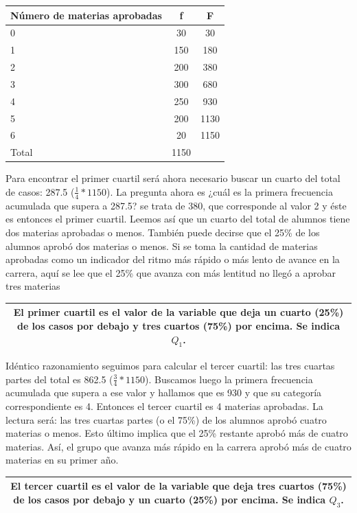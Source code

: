\documentclass[]{book}
\begin{document}
\begin{longtable}[]{@{}lcc@{}}
\toprule
Número de materias aprobadas & f & F\tabularnewline
\midrule
\endhead
0 & 30 & 30\tabularnewline
1 & 150 & 180\tabularnewline
2 & 200 & 380\tabularnewline
3 & 300 & 680\tabularnewline
4 & 250 & 930\tabularnewline
5 & 200 & 1130\tabularnewline
6 & 20 & 1150\tabularnewline
Total & 1150 &\tabularnewline
\bottomrule
\end{longtable}

Para encontrar el primer cuartil será ahora necesario buscar un cuarto
del total de casos: 287.5 (\(\frac{1}{4}*1150\)). La pregunta ahora es ¿cuál es
la primera frecuencia acumulada que supera a 287.5? se trata de 380, que
corresponde al valor 2 y éste es entonces el primer cuartil. Leemos así
que un cuarto del total de alumnos tiene dos materias aprobadas o menos.
También puede decirse que el 25\% de los alumnos aprobó dos materias o
menos. Si se toma la cantidad de materias aprobadas como un indicador
del ritmo más rápido o más lento de avance en la carrera, aquí se lee
que el 25\% que avanza con más lentitud no llegó a aprobar tres materias

\begin{longtable}[]{@{}c@{}}
\toprule
\endhead
\begin{minipage}[t]{0.97\columnwidth}\centering
El \textbf{primer cuartil} es el valor de la variable que deja un cuarto (25\%) de los casos por debajo y tres cuartos (75\%) por encima. Se indica \(Q_1\).\strut
\end{minipage}\tabularnewline
\bottomrule
\end{longtable}

Idéntico razonamiento seguimos para calcular el tercer cuartil: las tres
cuartas partes del total es 862.5 (\(\frac{3}{4}*1150\)). Buscamos luego la
primera frecuencia acumulada que supera a ese valor y hallamos que es
930 y que su categoría correspondiente es 4. Entonces el tercer cuartil
es 4 materias aprobadas. La lectura será: las tres cuartas partes (o el
75\%) de los alumnos aprobó cuatro materias o menos. Esto último implica
que el 25\% restante aprobó más de cuatro materias. Así, el grupo que
avanza más rápido en la carrera aprobó más de cuatro materias en su
primer año.

\begin{longtable}[]{@{}c@{}}
\toprule
\endhead
\begin{minipage}[t]{0.97\columnwidth}\centering
El \textbf{tercer cuartil} es el valor de la variable que deja tres cuartos (75\%) de los casos por debajo y un cuarto (25\%) por encima. Se indica \(Q_3\).\strut
\end{minipage}\tabularnewline
\bottomrule
\end{longtable}
\end{document}
